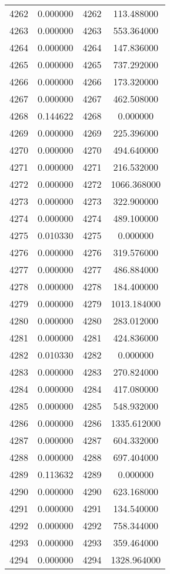 \documentclass[12pt]{article}
\begin{document}
\begin{longtable}{@{}cccc@{}}
4262 & 0.000000 & 4262 & 113.488000 \\
4263 & 0.000000 & 4263 & 553.364000 \\
4264 & 0.000000 & 4264 & 147.836000 \\
4265 & 0.000000 & 4265 & 737.292000 \\
4266 & 0.000000 & 4266 & 173.320000 \\
4267 & 0.000000 & 4267 & 462.508000 \\
4268 & 0.144622 & 4268 & 0.000000 \\
4269 & 0.000000 & 4269 & 225.396000 \\
4270 & 0.000000 & 4270 & 494.640000 \\
4271 & 0.000000 & 4271 & 216.532000 \\
4272 & 0.000000 & 4272 & 1066.368000 \\
4273 & 0.000000 & 4273 & 322.900000 \\
4274 & 0.000000 & 4274 & 489.100000 \\
4275 & 0.010330 & 4275 & 0.000000 \\
4276 & 0.000000 & 4276 & 319.576000 \\
4277 & 0.000000 & 4277 & 486.884000 \\
4278 & 0.000000 & 4278 & 184.400000 \\
4279 & 0.000000 & 4279 & 1013.184000 \\
4280 & 0.000000 & 4280 & 283.012000 \\
4281 & 0.000000 & 4281 & 424.836000 \\
4282 & 0.010330 & 4282 & 0.000000 \\
4283 & 0.000000 & 4283 & 270.824000 \\
4284 & 0.000000 & 4284 & 417.080000 \\
4285 & 0.000000 & 4285 & 548.932000 \\
4286 & 0.000000 & 4286 & 1335.612000 \\
4287 & 0.000000 & 4287 & 604.332000 \\
4288 & 0.000000 & 4288 & 697.404000 \\
4289 & 0.113632 & 4289 & 0.000000 \\
4290 & 0.000000 & 4290 & 623.168000 \\
4291 & 0.000000 & 4291 & 134.540000 \\
4292 & 0.000000 & 4292 & 758.344000 \\
4293 & 0.000000 & 4293 & 359.464000 \\
4294 & 0.000000 & 4294 & 1328.964000 \\

\end{longtable}
\end{document}
